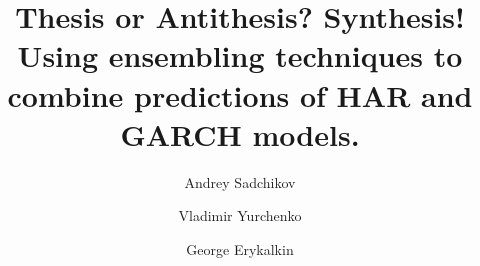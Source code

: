 \title{
Thesis or Antithesis? Synthesis! \\
Using ensembling techniques to combine predictions of HAR and GARCH models.
}
%
%
\author{Andrey Sadchikov\and
Vladimir Yurchenko\and
George Erykalkin
}
%
%
